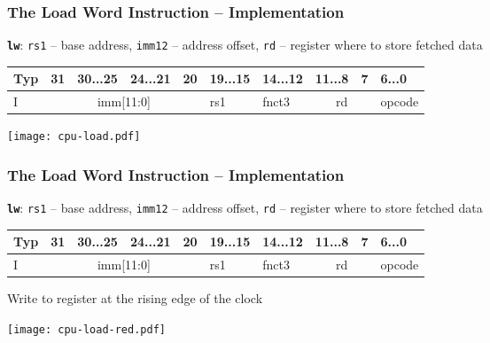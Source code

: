 \documentclass{beamer}
\begin{document}
\begin{frame}[shrink=15]
\frametitle{The Load Word Instruction -- Implementation}

\textbf{\texttt{lw}}: \texttt{rs1} -- base address, \texttt{imm12} -- address offset, \texttt{rd} -- register where to store fetched data

\bigskip

\begin{table}
\footnotesize
\begin{tabular}{|m{0.4cm}|m{0.4cm}|m{1.0cm}|m{1.0cm}|m{0.4cm}|m{1.0cm}|m{1.0cm}|m{1.0cm}|m{0.4cm}|m{1.0cm}|}\hline
Typ & 31 & 30...25 & 24...21 & 20 & 19...15 & 14...12 & 11...8 & 7 & 6...0 \\ \hline
I & \multicolumn{4}{c|}{ imm[11:0] } & rs1 & fnct3 &\multicolumn{2}{c|}{ rd } & opcode\\ \hline
\end{tabular}
\end{table}

\bigskip

\begin{center}
\texttt{[image: cpu-load.pdf]}
\end{center}

\end{frame}

\begin{frame}[shrink=15]
\frametitle{The Load Word Instruction -- Implementation}

\textbf{\texttt{lw}}: \texttt{rs1} -- base address, \texttt{imm12} -- address offset, \texttt{rd} -- register where to store fetched data

\bigskip

\begin{table}
\footnotesize
\begin{tabular}{|m{0.4cm}|m{0.4cm}|m{1.0cm}|m{1.0cm}|m{0.4cm}|m{1.0cm}|m{1.0cm}|m{1.0cm}|m{0.4cm}|m{1.0cm}|}\hline
Typ & 31 & 30...25 & 24...21 & 20 & 19...15 & 14...12 & 11...8 & 7 & 6...0 \\ \hline
I & \multicolumn{4}{c|}{ imm[11:0] } & rs1 & fnct3 &\multicolumn{2}{c|}{ rd } & opcode\\ \hline
\end{tabular}
\end{table}

Write to register at the rising edge of the clock

\begin{center}
\texttt{[image: cpu-load-red.pdf]}
\end{center}

\end{frame}
\end{document}

